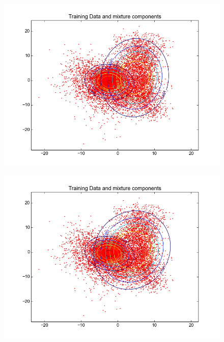 \documentclass[11pt,a4paper]{article}
\begin{document}
\begin{minipage}[b]{0.25\textwidth}
\begin{figure}[H]
  \centering
  \includegraphics[width=.8\linewidth]{Figures/contours_digiteight15.png}

  \label{fig:sfig1}
\end{figure}%
\end{minipage}
\begin{minipage}[b]{0.25\textwidth}
\begin{figure}[H]
  \centering
  \includegraphics[width=.8\linewidth]{Figures/contours_digiteight20.png}
 \label{fig:sfig1}
\end{figure}%
\end{minipage}
\end{document}
